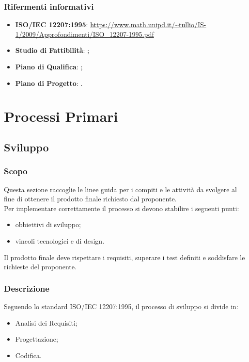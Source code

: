 \documentclass[]{article}
\begin{document}
			\subsubsection{Rifermenti informativi}
			\begin{itemize}
				\item \textbf{ISO/IEC 12207:1995}: \url{https://www.math.unipd.it/~tullio/IS-1/2009/Approfondimenti/ISO_12207-1995.pdf}
				\item \textbf{Studio di Fattibilità}: ; %
				\item \textbf{Piano di Qualifica}: ;
				\item \textbf{Piano di Progetto}: .
			\end{itemize}

		\newpage
		\section{Processi Primari}
			\subsection{Sviluppo}
				\subsubsection{Scopo}
				Questa sezione raccoglie le linee guida per i compiti e le attività da svolgere al fine di ottenere il prodotto finale richiesto dal proponente. \\
				Per implementare correttamente il processo si devono stabilire i seguenti punti:
				\begin{itemize}
					\item obbiettivi di sviluppo;
					\item vincoli tecnologici e di design.
				\end{itemize}
				Il prodotto finale deve rispettare i requisiti, superare i test definiti e soddisfare le richieste del proponente.
				\subsubsection{Descrizione}
				Seguendo lo standard ISO/IEC 12207:1995, il processo di sviluppo si divide in:
				\begin{itemize}
					\item Analisi dei Requisiti;
					\item Progettazione;
					\item Codifica.
				\end{itemize}
\end{document}
